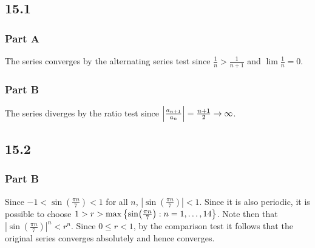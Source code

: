 \documentclass[12pt,titlepage]{extarticle}
\begin{document}
\subsection*{15.1}
\subsubsection*{Part A}
The series converges by the alternating series test since $\frac{1}{n} > \frac{1}{n+1}$ and $\lim\frac{1}{n} = 0$.

\subsubsection*{Part B}
The series diverges by the ratio test since $\qty|\frac{a_{n+1}}{a_n}| = \frac{n+1}{2} \to \infty$.

\subsection*{15.2}
\subsubsection*{Part B}
Since $-1 < \sin(\frac{\pi n}{7}) < 1$ for all $n$, $|\sin(\frac{\pi n}{7})| < 1$. Since it is also periodic, it is possible to choose $1 > r > \max\qty{\sin(\frac{\pi n}{7}) : n = 1,\ldots,14}$. Note then that $|\sin(\frac{\pi n}{7})|^n < r^n$. Since $0 \leq r < 1$, by the comparison test it follows that the original series converges absolutely and hence converges.
\end{document}

